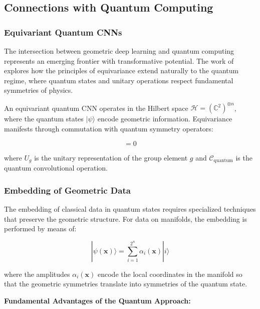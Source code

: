 \subsection{Connections with Quantum Computing}

\subsubsection{Equivariant Quantum CNNs}

The intersection between geometric deep learning and quantum computing represents an emerging frontier with transformative potential. The work of \citet{west2024quantum} explores how the principles of equivariance extend naturally to the quantum regime, where quantum states and unitary operations respect fundamental symmetries of physics.

An equivariant quantum CNN operates in the Hilbert space $\mathcal{H} = (\mathbb{C}^2)^{\otimes n}$, where the quantum states $|\psi\rangle$ encode geometric information. Equivariance manifests through commutation with quantum symmetry operators:

\begin{equation}
[U_g, \mathcal{C}_\text{quantum}] = 0
\end{equation}

where $U_g$ is the unitary representation of the group element $g$ and $\mathcal{C}_\text{quantum}$ is the quantum convolutional operation.

\subsubsection{Embedding of Geometric Data}

The embedding of classical data in quantum states requires specialized techniques that preserve the geometric structure. For data on manifolds, the embedding is performed by means of:

\begin{equation}
|\psi(\mathbf{x})\rangle = \sum_{i=1}^{2^n} \alpha_i(\mathbf{x}) |i\rangle
\end{equation}

where the amplitudes $\alpha_i(\mathbf{x})$ encode the local coordinates in the manifold so that the geometric symmetries translate into symmetries of the quantum state.

\textbf{Fundamental Advantages of the Quantum Approach:}

